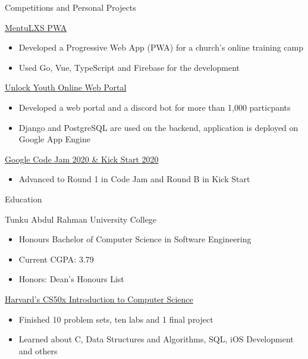 \documentclass{article}
\newlength{\tabin}
\newlength{\secsep}
\newcommand{\lineunder}{\vspace*{-8pt} \\ \hspace*{-6pt} \hrulefill \\ \vspace*{-15pt}}
\newenvironment{tabbedsection}[1]{
  \begin{list}{}{
      \setlength{\itemsep}{0pt}
      \setlength{\labelsep}{0pt}
      \setlength{\labelwidth}{0pt}
      \setlength{\leftmargin}{\tabin}
      \setlength{\rightmargin}{\tabin}
      \setlength{\listparindent}{0pt}
      \setlength{\parsep}{0pt}
      \setlength{\parskip}{0pt}
      \setlength{\partopsep}{0pt}
      \setlength{\topsep}{#1}
    }
  \item[]
}{\end{list}}
\newenvironment{resume_section}[1]{
  \filbreak
  \vspace{2\secsep}
  \textsc{\large#1}
  \lineunder
  \begin{tabbedsection}{\secsep}
}{\end{tabbedsection}}
\newenvironment{resume_subsection}[2][]{
  \textbf{#2} \hfill {\footnotesize #1} \hspace{2em}
  \begin{tabbedsection}{0.5\secsep}
}{\end{tabbedsection}}
\newenvironment{subitems}{
  \renewcommand{\labelitemi}{-}
  \begin{itemize}
      \setlength{\labelsep}{1em}
}{\end{itemize}}
\begin{document}
\begin{resume_section}{Competitions and Personal Projects}
  \begin{resume_subsection}[(August 2021)]{\href{https://github.com/marcustut/mentu-lxs}{MentuLXS PWA}}
    \begin{subitems}
        \item Developed a Progressive Web App (PWA) for a church's online training camp
        \item Used Go, Vue, TypeScript and Firebase for the development
    \end{subitems}
  \end{resume_subsection}

  \begin{resume_subsection}{\href{https://github.com/marcustut/UnlockProject}{Unlock Youth Online Web Portal}}
    \begin{subitems}
    \item Developed a web portal and a discord bot for more than 1,000 particpants
    \item Django and PostgreSQL are used on the backend, application is deployed on Google App Engine
    \end{subitems}
  \end{resume_subsection}
  
  \begin{resume_subsection}{\href{https://drive.google.com/drive/folders/1PXG8UBWxGFG66U_oSWwOouJDr8cWGGAu?usp=sharing}{Google Code Jam 2020 \& Kick Start 2020}}
    \begin{subitems}
    \item Advanced to Round 1 in Code Jam and Round B in Kick Start
    \end{subitems}
  \end{resume_subsection}
\end{resume_section}


\begin{resume_section}{Education}
  \begin{resume_subsection}{Tunku Abdul Rahman University College}
    \begin{subitems}
      \item Honours Bachelor of Computer Science in Software Engineering
      \item Current CGPA: 3.79
      \item Honors: Dean's Honours List
    \end{subitems}
  \end{resume_subsection}
  
  \begin{resume_subsection}[Online (2020--2021)]{\href{https://drive.google.com/file/d/1-tVq-vD20YwCcI3YgotgKKe_UYvHTwBj/view?usp=sharing}{Harvard's CS50x Introduction to Computer Science}}
    \begin{subitems}
      \item Finished 10 problem sets, ten labs and 1 final project
      \item Learned about C, Data Structures and Algorithms, SQL, iOS Development and others
     \end{subitems}
  \end{resume_subsection}
\end{resume_section}
\end{document}
